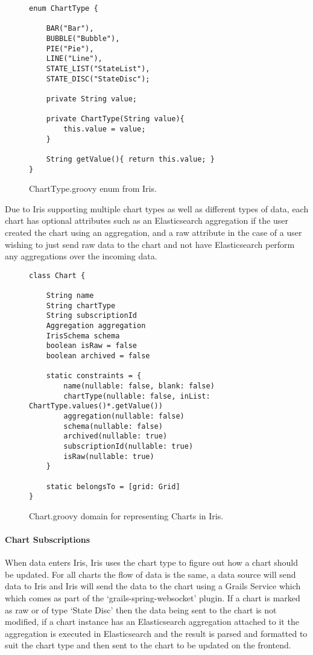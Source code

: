 \documentclass[12pt,a4paper,titlepage]{report}
\begin{document}
\begin{figure}[H]
\begin{tcolorbox}
\begin{verbatim}
enum ChartType {

    BAR("Bar"),
    BUBBLE("Bubble"),
    PIE("Pie"),
    LINE("Line"),
    STATE_LIST("StateList"),
    STATE_DISC("StateDisc");

    private String value;

    private ChartType(String value){
        this.value = value;
    }

    String getValue(){ return this.value; }
}
\end{verbatim}
\end{tcolorbox}
\caption{ChartType.groovy enum from Iris.}
\end{figure}
Due to Iris supporting multiple chart types as well as different types of data, each chart has optional attributes such as an Elasticsearch aggregation if the user created the chart using an aggregation, and a raw attribute in the case of a user wishing to just send raw data to the chart and not have Elasticsearch perform any aggregations over the incoming data.
\begin{figure}[H]
\begin{tcolorbox}
\begin{verbatim}
class Chart {

    String name
    String chartType
    String subscriptionId
    Aggregation aggregation
    IrisSchema schema
    boolean isRaw = false
    boolean archived = false

    static constraints = {
        name(nullable: false, blank: false)
        chartType(nullable: false, inList: ChartType.values()*.getValue())
        aggregation(nullable: false)
        schema(nullable: false)
        archived(nullable: true)
        subscriptionId(nullable: true)
        isRaw(nullable: true)
    }

    static belongsTo = [grid: Grid]
}
\end{verbatim}
\end{tcolorbox}
\caption{Chart.groovy domain for representing Charts in Iris.}
\end{figure}

\paragraph{Chart Subscriptions}
When data enters Iris, Iris uses the chart type to figure out how a chart should be updated. For all charts the flow of data is the same, a data source will send data to Iris and Iris will send the data to the chart using a Grails Service which which comes as part of the `grails-spring-websocket' plugin. If a chart is marked as raw or of type `State Disc' then the data being sent to the chart is not modified, if a chart instance has an Elasticsearch aggregation attached to it the aggregation is executed in Elasticsearch and the result is parsed and formatted to suit the chart type and then sent to the chart to be updated on the frontend.
\end{document}
